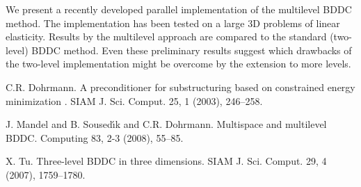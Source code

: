 We present a recently developed parallel implementation of the multilevel BDDC method.
The implementation has been tested on a large 3D problems of linear elasticity.
Results by the multilevel approach are compared to the standard (two-level) BDDC method.
Even these preliminary results suggest which drawbacks of the two-level implementation might be overcome by the extension to more levels.



\begin{thebibliography}{10}

{\sc C.R. Dohrmann}. {A preconditioner for substructuring based on constrained energy minimization }. SIAM J. Sci. Comput. 25, 1 (2003), 246--258.



{\sc J. Mandel and B. Soused{\'\i}k and C.R. Dohrmann}. {Multispace and multilevel {BDDC}}. Computing 83, 2-3 (2008), 55--85.



{\sc X. Tu}. {Three-level {BDDC} in three dimensions}. SIAM J. Sci. Comput. 29, 4 (2007), 1759--1780.

\end{thebibliography}
